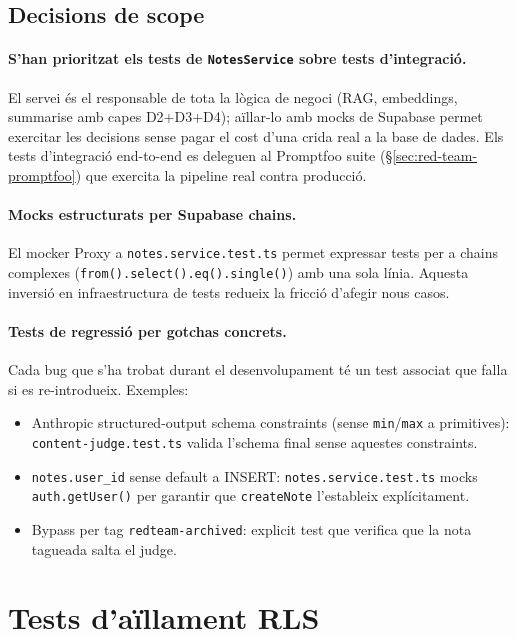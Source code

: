 \subsection{Decisions de scope}

\paragraph{S'han prioritzat els tests de \texttt{NotesService} sobre tests d'integració.} El servei és el responsable de tota la lògica de negoci (RAG, embeddings, summarise amb capes D2+D3+D4); aïllar-lo amb mocks de Supabase permet exercitar les decisions sense pagar el cost d'una crida real a la base de dades. Els tests d'integració end-to-end es deleguen al Promptfoo suite (\S\ref{sec:red-team-promptfoo}) que exercita la pipeline real contra producció.

\paragraph{Mocks estructurats per Supabase chains.} El mocker Proxy a \texttt{notes.service.test.ts} permet expressar tests per a chains complexes (\texttt{from().select().eq().single()}) amb una sola línia. Aquesta inversió en infraestructura de tests redueix la fricció d'afegir nous casos.

\paragraph{Tests de regressió per gotchas concrets.} Cada bug que s'ha trobat durant el desenvolupament té un test associat que falla si es re-introdueix. Exemples:

\begin{itemize}
    \item Anthropic structured-output schema constraints (sense \texttt{min}/\texttt{max} a primitives): \texttt{content-judge.test.ts} valida l'schema final sense aquestes constraints.
    \item \texttt{notes.user\_id} sense default a INSERT: \texttt{notes.service.test.ts} mocks \texttt{auth.getUser()} per garantir que \texttt{createNote} l'estableix explícitament.
    \item Bypass per tag \texttt{redteam-archived}: explicit test que verifica que la nota tagueada salta el judge.
\end{itemize}

\section{Tests d'aïllament RLS}
\label{sec:rls}

